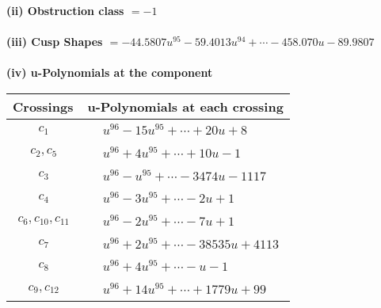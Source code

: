 \documentclass[1p]{elsarticle_modified}
\theoremstyle{definition}
\begin{document}
\flushleft \textbf{(ii) Obstruction class $= -1$}\\~\\
\flushleft \textbf{(iii) Cusp Shapes $= -44.5807 u^{95}-59.4013 u^{94}+\cdots-458.070 u-89.9807$}\\~\\
\newpage\renewcommand{\arraystretch}{1}
\flushleft \textbf{(iv) u-Polynomials at the component}\newline \\
\begin{tabular}{m{50pt}|m{274pt}}
Crossings & \hspace{64pt}u-Polynomials at each crossing \\
\hline $$\begin{aligned}c_{1}\end{aligned}$$&$\begin{aligned}
&u^{96}-15 u^{95}+\cdots+20 u+8
\end{aligned}$\\
\hline $$\begin{aligned}c_{2},c_{5}\end{aligned}$$&$\begin{aligned}
&u^{96}+4 u^{95}+\cdots+10 u-1
\end{aligned}$\\
\hline $$\begin{aligned}c_{3}\end{aligned}$$&$\begin{aligned}
&u^{96}- u^{95}+\cdots-3474 u-1117
\end{aligned}$\\
\hline $$\begin{aligned}c_{4}\end{aligned}$$&$\begin{aligned}
&u^{96}-3 u^{95}+\cdots-2 u+1
\end{aligned}$\\
\hline $$\begin{aligned}c_{6},c_{10},c_{11}\end{aligned}$$&$\begin{aligned}
&u^{96}-2 u^{95}+\cdots-7 u+1
\end{aligned}$\\
\hline $$\begin{aligned}c_{7}\end{aligned}$$&$\begin{aligned}
&u^{96}+2 u^{95}+\cdots-38535 u+4113
\end{aligned}$\\
\hline $$\begin{aligned}c_{8}\end{aligned}$$&$\begin{aligned}
&u^{96}+4 u^{95}+\cdots- u-1
\end{aligned}$\\
\hline $$\begin{aligned}c_{9},c_{12}\end{aligned}$$&$\begin{aligned}
&u^{96}+14 u^{95}+\cdots+1779 u+99
\end{aligned}$\\
\hline
\end{tabular}\\~\\
\end{document}
